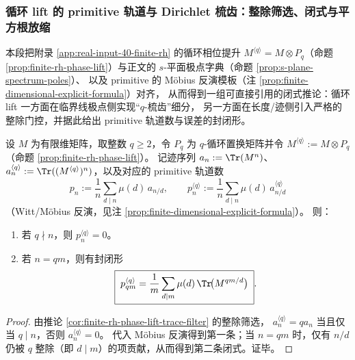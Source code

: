 \subsubsection{循环 lift 的 primitive 轨道与 Dirichlet 梳齿：整除筛选、闭式与平方根放缩}\label{subsubsec:zeta-online-kernel-cyclic-lift-primitives}
本段把附录 \ref{app:real-input-40-finite-rh} 的循环相位提升 \(M^{\langle q\rangle}=M\otimes P_q\)（命题 \ref{prop:finite-rh-phase-lift}）与正文的
\(s\)-平面极点字典（命题 \ref{prop:s-plane-spectrum-poles}）、
以及 primitive 的 Möbius 反演模板（注 \ref{prop:finite-dimensional-explicit-formula}）对齐，
从而得到一组可直接引用的闭式推论：循环 lift 一方面在临界线极点侧实现“\(q\)-梳齿”细分，
另一方面在长度/迹侧引入严格的整除门控，并据此给出 primitive 轨道数与误差的封闭形。

\begin{corollary}\label{cor:zeta-cyclic-lift-primitive-orbits}
设 \(M\) 为有限维矩阵，取整数 \(q\ge 2\)，令 \(P_q\) 为 \(q\)-循环置换矩阵并令 \(M^{\langle q\rangle}:=M\otimes P_q\)（命题 \ref{prop:finite-rh-phase-lift}）。
记迹序列 \(a_n:=\Tr(M^n)\)、\(a_n^{\langle q\rangle}:=\Tr((M^{\langle q\rangle})^n)\)，以及对应的 primitive 轨道数
\[
p_n:=\frac{1}{n}\sum_{d\mid n}\mu(d)\,a_{n/d},
\qquad
p_n^{\langle q\rangle}:=\frac{1}{n}\sum_{d\mid n}\mu(d)\,a^{\langle q\rangle}_{n/d}
\]
（Witt/Möbius 反演，见注 \ref{prop:finite-dimensional-explicit-formula}）。
则：
\begin{enumerate}
  \item 若 \(q\nmid n\)，则 \(p_n^{\langle q\rangle}=0\)。
  \item 若 \(n=qm\)，则有封闭形
  \[
  \boxed{\;
  p_{qm}^{\langle q\rangle}
  =\frac{1}{m}\sum_{d\mid m}\mu(d)\,\Tr\!\bigl(M^{qm/d}\bigr)\; }.
  \]
\end{enumerate}
\end{corollary}
\begin{proof}
由推论 \ref{cor:finite-rh-phase-lift-trace-filter} 的整除筛选，
\(
a_n^{\langle q\rangle}=q a_n
\)
当且仅当 \(q\mid n\)，否则 \(a_n^{\langle q\rangle}=0\)。
代入 Möbius 反演得到第一条；当 \(n=qm\) 时，仅有 \(n/d\) 仍被 \(q\) 整除（即 \(d\mid m\)）的项贡献，从而得到第二条闭式。证毕。
\end{proof}

